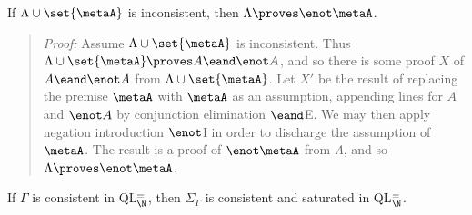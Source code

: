 %
%
%
%

\begin{Lthm} \label{lemma:incon}
  If $\Lambda\cup\set{\metaA}$ is inconsistent, then $\Lambda\proves\enot\metaA$. 
\end{Lthm}

\begin{quote} 
  \textit{Proof:} Assume $\Lambda\cup\set{\metaA}$ is inconsistent.
  Thus $\Lambda\cup\set{\metaA}\proves A\eand\enot A$, and so there is some proof $X$ of $A\eand\enot A$ from $\Lambda\cup\set{\metaA}$. 
  Let $X'$ be the result of replacing the premise $\metaA$ with $\metaA$ as an assumption, appending lines for $A$ and $\enot A$ by conjunction elimination $\eand$E. 
  We may then apply negation introduction $\enot$I in order to discharge the assumption of $\metaA$.
  The result is a proof of $\enot\metaA$ from $\Lambda$, and so $\Lambda\proves\enot\metaA$. 
\end{quote}




\begin{Lthm} \label{lemma:sat}
  If $\Gamma$ is consistent in QL$^=_{\N}$, then $\Sigma_\Gamma$ is consistent and saturated in QL$^=_{\N}$. 
\end{Lthm}

